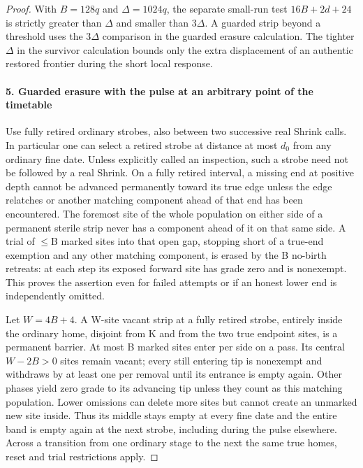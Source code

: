 \begin{proof}
With \(B=128q\) and \(\Delta =1024q\), the separate small-run test \(16B+2d+24\) is strictly greater than \(\Delta\) and smaller than 3\(\Delta\). A guarded strip beyond a threshold uses the 3\(\Delta\) comparison in the guarded erasure calculation. The tighter \(\Delta\) in the survivor calculation bounds only the extra displacement of an authentic restored frontier during the short local response.

\paragraph{5. Guarded erasure with the pulse at an arbitrary point of the timetable}

Use fully retired ordinary strobes, also between two successive real Shrink calls. In particular one can select a retired strobe at distance at most \(d_0\) from any ordinary fine date. Unless explicitly called an inspection, such a strobe need not be followed by a real Shrink. On a fully retired interval, a missing end at positive depth cannot be advanced permanently toward its true edge unless the edge relatches or another matching component ahead of that end has been encountered. The foremost site of the whole population on either side of a permanent sterile strip never has a component ahead of it on that same side. A trial of \(\le\)B marked sites into that open gap, stopping short of a true-end exemption and any other matching component, is erased by the B no-birth retreats: at each step its exposed forward site has grade zero and is nonexempt. This proves the assertion even for failed attempts or if an honest lower end is independently omitted.

Let \(W=4B+4\). A W-site vacant strip at a fully retired strobe, entirely inside the ordinary home, disjoint from K and from the two true endpoint sites, is a permanent barrier. At most B marked sites enter per side on a pass. Its central \(W- 2B>0\) sites remain vacant; every still entering tip is nonexempt and withdraws by at least one per removal until its entrance is empty again. Other phases yield zero grade to its advancing tip unless they count as this matching population. Lower omissions can delete more sites but cannot create an unmarked new site inside. Thus its middle stays empty at every fine date and the entire band is empty again at the next strobe, including during the pulse elsewhere. Across a transition from one ordinary stage to the next the same true homes, reset and trial restrictions apply.


\end{proof}

